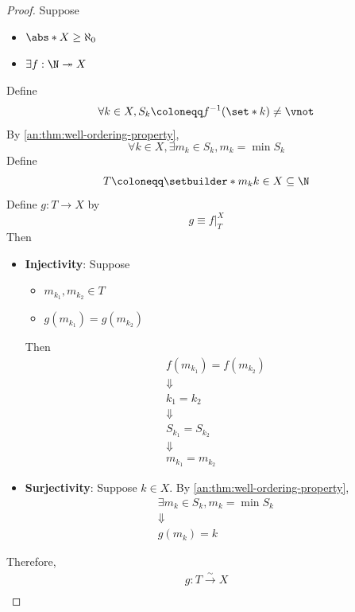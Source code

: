 \begin{proof}
  Suppose
  \begin{itemize}
    \item $\abs*{X} \geq \aleph_{0}$
    \item $\exists f: \N \twoheadrightarrow X$
  \end{itemize}
  Define
  \[
    \forall k \in X, S_{k} \coloneqq f^{-1}(\set*{k}) \neq \vnot
  \]
  By \cref{an:thm:well-ordering-property},
  \[
    \forall k \in X, \exists m_{k} \in S_{k}, m_{k} = \min S_{k}
  \]
  Define
  \[
    T \coloneqq \setbuilder*{m_{k}}{k \in X} \subseteq \N
  \]
  Define $g: T \to X$ by
  \[
    g \equiv f|_{T}^{X}
  \]
  Then
  \begin{itemize}
    \item \textbf{Injectivity}: Suppose
          \begin{itemize}
            \item $m_{k_{1}}, m_{k_{2}} \in T$
            \item $g(m_{k_{1}}) = g(m_{k_{2}})$
          \end{itemize}
          Then
          \[
            \begin{array}{c}
              f(m_{k_{1}}) = f(m_{k_{2}}) \\
              \Downarrow                  \\
              k_{1} = k_{2}               \\
              \Downarrow                  \\
              S_{k_{1}} = S_{k_{2}}       \\
              \Downarrow                  \\
              m_{k_{1}} = m_{k_{2}}
            \end{array}
          \]
    \item \textbf{Surjectivity}: Suppose $k \in X$. By \cref{an:thm:well-ordering-property},
          \[
            \begin{array}{c}
              \exists m_{k} \in S_{k}, m_{k} = \min S_{k} \\
              \Downarrow                                  \\
              g(m_{k}) = k
            \end{array}
          \]
  \end{itemize}
  Therefore,
  \[
    \begin{array}{c}
      g: T \xrightarrow{\sim} X                                                                                        \\

\end{array}\]
\end{proof}
